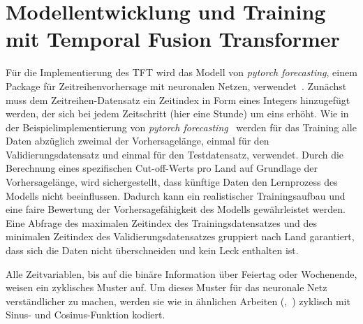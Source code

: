 \section{Modellentwicklung und Training mit Temporal Fusion Transformer}
Für die Implementierung des \ac{TFT} wird das Modell von \textit{pytorch forecasting}, einem Package für Zeitreihenvorhersage mit neuronalen Netzen, verwendet~\cite{PytorchForecastingDocumentation.20230410T20:05:46.000Z}.
Zunächst muss dem Zeitreihen-Datensatz ein Zeitindex in Form eines Integers hinzugefügt werden, der sich bei jedem Zeitschritt (hier eine Stunde) um eins erhöht.
Wie in der Beispielimplementierung von \textit{pytorch forecasting}~\cite{GitHub.20240307T20:56:16.000Z} werden für das Training alle Daten abzüglich zweimal der Vorhersagelänge, einmal für den Validierungsdatensatz und einmal für den Testdatensatz, verwendet.
Durch die Berechnung eines spezifischen Cut-off-Werts pro Land auf Grundlage der Vorhersagelänge, wird sichergestellt, dass künftige Daten den Lernprozess des Modells nicht beeinflussen.
Dadurch kann ein realistischer Trainingsaufbau und eine faire Bewertung der Vorhersagefähigkeit des Modells gewährleistet werden.
Eine Abfrage des maximalen Zeitindex des Trainingsdatensatzes und des minimalen Zeitindex des Validierungsdatensatzes gruppiert nach Land garantiert, dass sich die Daten nicht überschneiden und kein Leck enthalten ist.

Alle Zeitvariablen, bis auf die binäre Information über Feiertag oder Wochenende, weisen ein zyklisches Muster auf.
Um dieses Muster für das neuronale Netz verständlicher zu machen, werden sie wie in ähnlichen Arbeiten (\cite{Giacomazzi.06202023},~\cite{Labiadh.2.8.2023}) zyklisch mit Sinus- und Cosinus-Funktion kodiert.

